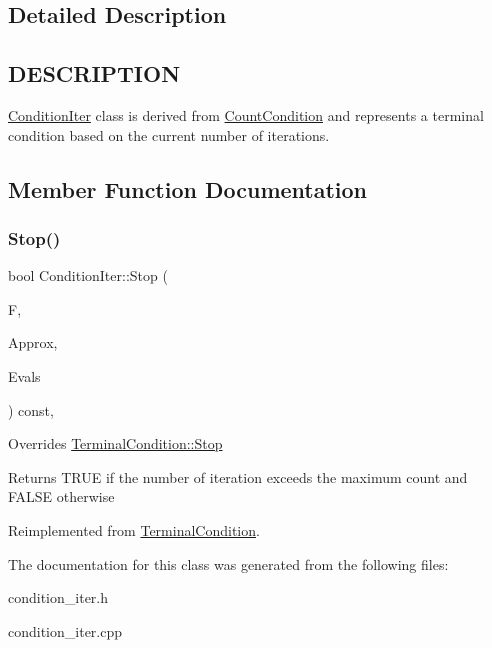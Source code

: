 \subsection{Detailed Description}
\hypertarget{function_8h_DESCRIPTION}{}\subsection{D\+E\+S\+C\+R\+I\+P\+T\+I\+ON}\label{function_8h_DESCRIPTION}
\hyperlink{class_condition_iter}{Condition\+Iter} class is derived from \hyperlink{class_count_condition}{Count\+Condition} and represents a terminal condition based on the current number of iterations. 

\subsection{Member Function Documentation}
\mbox{\label{class_condition_iter_af9de25d536e5a9af7bd711e569356533}} 
\subsubsection{\texorpdfstring{Stop()}{Stop()}}
{\footnotesize\ttfamily bool Condition\+Iter\+::\+Stop (\begin{DoxyParamCaption}\item[{std\+::shared\+\_\+ptr$<$ \hyperlink{class_function}{Function} $>$}]{F,  }\item[{const std\+::vector$<$ \hyperlink{classv_point}{v\+Point} $>$ \&}]{Approx,  }\item[{const std\+::vector$<$ double $>$ \&}]{Evals }\end{DoxyParamCaption}) const\hspace{0.3cm}{\ttfamily [override]}, {\ttfamily [virtual]}}

Overrides \hyperlink{class_terminal_condition_ad6294bf2bd6f5e2c6164e461c24d3198}{Terminal\+Condition\+::\+Stop} \begin{DoxyReturn}{Returns}
T\+R\+UE if the number of iteration exceeds the maximum count and F\+A\+L\+SE otherwise 
\end{DoxyReturn}


Reimplemented from \hyperlink{class_terminal_condition_ad6294bf2bd6f5e2c6164e461c24d3198}{Terminal\+Condition}.



The documentation for this class was generated from the following files\+:\begin{DoxyCompactItemize}
\item 
condition\+\_\+iter.\+h\item 
condition\+\_\+iter.\+cpp\end{DoxyCompactItemize}

